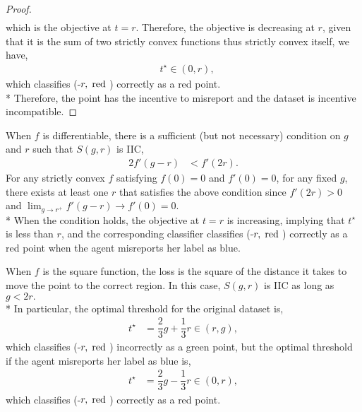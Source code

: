 \documentclass{article}
\begin{document}
\begin{proof}
\begin{align*}
\end{align*}
which is the objective at $t  = r $. Therefore, the objective is decreasing at $r $, given that it is the sum of two strictly convex functions thus strictly convex itself, we have,
\begin{align*}
&t^\star  \in \left(0, r \right),
\end{align*}
which classifies (-$r , \text{\;red\;}$) correctly as a red point.
\\* Therefore, the point has the incentive to misreport and the dataset is incentive incompatible.
\newline \newline\end{proof}
\begin{eg} \label{eg:ex1sq} 
When $f $ is differentiable, there is a sufficient (but not necessary) condition on $g $ and $r $ such that $S\left(g, r \right) $ is IIC,
\begin{align*}
2 f'\left(g - r\right) &< f'\left(2 r\right).
\end{align*}
For any strictly convex $f $ satisfying $f\left(0\right)  = 0$ and $f'\left(0\right)  = 0$, for any fixed $g $, there exists at least one $r $ that satisfies the above condition since $f'\left(2 r\right)  > 0$ and $\lim_{g \to  r^{+}} f'\left(g - r\right) \to  f'\left(0\right) = 0$.
\\* When the condition holds, the objective at $t  = r $ is increasing, implying that $t^\star $ is less than $r $, and the corresponding classifier classifies (-$r , \text{\;red\;}$) correctly as a red point when the agent misreports her label as blue.
\newline \newline\end{eg}
\begin{eg} \label{eg:ex2sq} 
When $f $ is the square function, the loss is the square of the distance it takes to move the point to the correct region. In this case, $S\left(g, r\right) $ is IIC as long as $g  < 2 r. $
\\* In particular, the optimal threshold for the original dataset is,
\begin{align*}
t^\star  &= \dfrac{2}{3} g + \dfrac{1}{3} r \in \left(r , g \right),
\end{align*}
which classifies (-$r , \text{\;red\;}$) incorrectly as a green point, but the optimal threshold if the agent misreports her label as blue is,
\begin{align*}
t^\star  &= \dfrac{2}{3} g - \dfrac{1}{3} r \in \left(0, r \right),
\end{align*}
which classifies (-$r , \text{\;red\;}$) correctly as a red point.
\newline \newline\end{eg}
\end{document}
